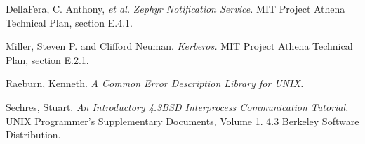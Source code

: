 %
\newpage\begin{thebibliography}{99}

 DellaFera, C. Anthony, {\em et al.\/} {\em
Zephyr Notification Service.\/}  MIT Project Athena Technical Plan,
section E.4.1.

 Miller, Steven P. and Clifford Neuman.  {\em
Kerberos.\/}  MIT Project Athena Technical Plan, section E.2.1.

 Raeburn, Kenneth.  {\em A Common Error
Description Library for UNIX.}

 Sechres, Stuart.  {\em An Introductory 4.3BSD
Interprocess Communication Tutorial.}  UNIX Programmer's Supplementary
Documents, Volume 1.  4.3 Berkeley Software Distribution.

\end{thebibliography}
